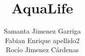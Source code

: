 \documentclass[]{report}
\title{AquaLife}
\author{Samanta Jimenez Garriga \\ Fabian Enrique apellido2 \\ Roc\'io Jimenez C\'ardenas}
\begin{document}
\maketitle

\begin{abstract}
\end{abstract}
\end{document}
